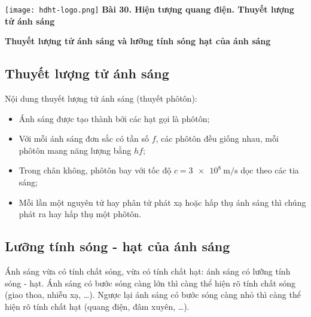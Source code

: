 \newcommand{\chapter}[2][]{
	\newcommand{\chapname}{#2}
	\begin{flushleft}
		\begin{minipage}[t]{\linewidth}
			\texttt{[image: hdht-logo.png]}
			\hspace{0pt}	
			\sffamily\bfseries\large Bài  30. Hiện tượng quang điện. Thuyết lượng tử ánh sáng
			\begin{flushleft}
				\huge\bfseries #1
			\end{flushleft}
		\end{minipage}
	\end{flushleft}
	\vspace{1cm}
	\normalfont\normalsize
}
\chapter[Thuyết lượng tử ánh sáng và lưỡng tính sóng hạt của ánh sáng]{ Thuyết lượng tử ánh sáng \\và lưỡng tính sóng hạt của ánh sáng}

\subsection{Thuyết lượng tử ánh sáng}
Nội dung thuyết lượng tử ánh sáng (thuyết phôtôn):
\begin{itemize}
	\item Ánh sáng được tạo thành bởi các hạt gọi là phôtôn;
	\item Với mỗi ánh sáng đơn sắc có tần số $f$, các phôtôn đều giống nhau, mỗi phôtôn mang năng lượng bằng $hf$;
	\item Trong chân không, phôtôn bay với tốc độ $c=\SI{3e8}{\meter / \second}$ dọc theo các tia sáng;
	\item Mỗi lần một nguyên tử hay phân tử phát xạ hoặc hấp thụ ánh sáng thì chúng phát ra hay hấp thụ một phôtôn.
\end{itemize}
\subsection{Lưỡng tính sóng - hạt của ánh sáng}
Ánh sáng vừa có tính chất sóng, vừa có tính chất hạt: ánh sáng có lưỡng tính sóng - hạt. Ánh sáng có bước sóng càng lớn thì càng thể hiện rõ tính chất sóng (giao thoa, nhiễu xạ, \ldots). Ngược lại ánh sáng có bước sóng càng nhỏ thì càng thể hiện rõ tính chất hạt (quang điện, đâm xuyên, \ldots).
